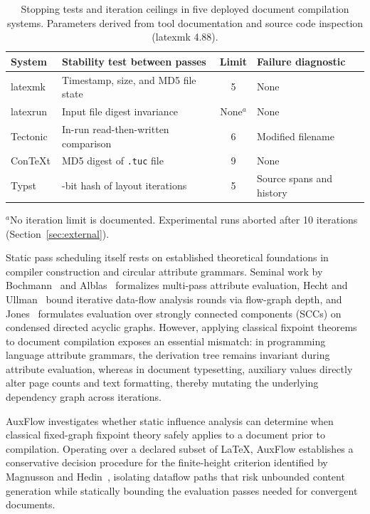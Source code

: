 \documentclass[conference]{IEEEtran}
\begin{document}
\begin{table}[t]
\caption{Stopping tests and iteration ceilings in five deployed document compilation systems. Parameters derived from tool documentation and source code inspection (latexmk 4.88).}
\label{tab:oracles}
\centering
\footnotesize
\setlength{\tabcolsep}{3pt}
\begin{tabular}{@{}p{}>{\raggedright\arraybackslash}p{}c>{\raggedright\arraybackslash}p{}@{}}
\toprule
System & Stability test between passes & Limit & Failure diagnostic \\
\midrule
latexmk & Timestamp, size, and MD5 file state & 5 & None \\
latexrun~\cite{latexrun} & Input file digest invariance & None$^{a}$ & None \\
Tectonic & In-run read-then-written comparison & 6 & Modified filename \\
ConTeXt & MD5 digest of \texttt{.tuc} file & 9 & None \\
Typst & 128-bit hash of layout iterations & 5 & Source spans and history \\
\bottomrule
\end{tabular}

\smallskip
\footnotesize $^{a}$No iteration limit is documented. Experimental runs aborted after 10 iterations (Section~\ref{sec:external}).
\end{table}

Static pass scheduling itself rests on established theoretical foundations in compiler construction and circular attribute grammars. Seminal work by Bochmann~\cite{bochmann1976} and Alblas~\cite{alblas1981} formalizes multi-pass attribute evaluation, Hecht and Ullman~\cite{hecht1975} bound iterative data-flow analysis rounds via flow-graph depth, and Jones~\cite{jones1990} formulates evaluation over strongly connected components (SCCs) on condensed directed acyclic graphs. However, applying classical fixpoint theorems to document compilation exposes an essential mismatch: in programming language attribute grammars, the derivation tree remains invariant during attribute evaluation, whereas in document typesetting, auxiliary values directly alter page counts and text formatting, thereby mutating the underlying dependency graph across iterations.

AuxFlow investigates whether static influence analysis can determine when classical fixed-graph fixpoint theory safely applies to a document prior to compilation. Operating over a declared subset of \LaTeX, AuxFlow establishes a conservative decision procedure for the finite-height criterion identified by Magnusson and Hedin~\cite{magnusson2007}, isolating dataflow paths that risk unbounded content generation while statically bounding the evaluation passes needed for convergent documents.
\end{document}

